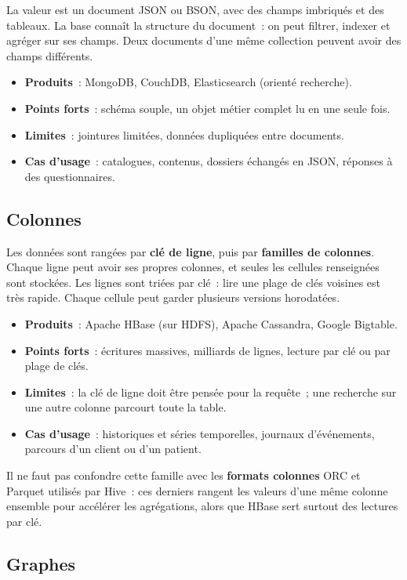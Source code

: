 \noindent La valeur est un document JSON ou BSON, avec des champs imbriqués et des tableaux. La base connaît la structure du document~: on peut filtrer, indexer et agréger sur ses champs. Deux documents d'une même collection peuvent avoir des champs différents.
\begin{itemize}
	\item \textbf{Produits}~: MongoDB, CouchDB, Elasticsearch (orienté recherche).
	\item \textbf{Points forts}~: schéma souple, un objet métier complet lu en une seule fois.
	\item \textbf{Limites}~: jointures limitées, données dupliquées entre documents.
	\item \textbf{Cas d'usage}~: catalogues, contenus, dossiers échangés en JSON, réponses à des questionnaires.
\end{itemize}

\subsection{Colonnes}

\noindent Les données sont rangées par \textbf{clé de ligne}, puis par \textbf{familles de colonnes}. Chaque ligne peut avoir ses propres colonnes, et seules les cellules renseignées sont stockées. Les lignes sont triées par clé~: lire une plage de clés voisines est très rapide. Chaque cellule peut garder plusieurs versions horodatées.
\begin{itemize}
	\item \textbf{Produits}~: Apache HBase (sur HDFS), Apache Cassandra, Google Bigtable.
	\item \textbf{Points forts}~: écritures massives, milliards de lignes, lecture par clé ou par plage de clés.
	\item \textbf{Limites}~: la clé de ligne doit être pensée pour la requête~; une recherche sur une autre colonne parcourt toute la table.
	\item \textbf{Cas d'usage}~: historiques et séries temporelles, journaux d'événements, parcours d'un client ou d'un patient.
\end{itemize}

\noindent Il ne faut pas confondre cette famille avec les \textbf{formats colonnes} ORC et Parquet utilisés par Hive~: ces derniers rangent les valeurs d'une même colonne ensemble pour accélérer les agrégations, alors que HBase sert surtout des lectures par clé.

\subsection{Graphes}

